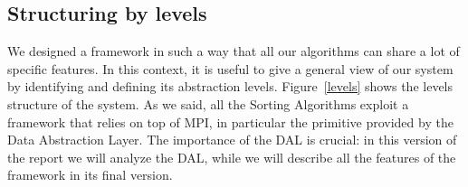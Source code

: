 \subsection{Structuring by levels}
We designed a framework in such a way that all our algorithms can share a lot of specific features. In this context, it is useful to give a general view of our system by identifying and defining its abstraction levels. Figure~\ref{levels} shows the levels structure of the system. As we said, all the Sorting Algorithms exploit a framework that relies on top of MPI, in particular the primitive provided by the Data Abstraction Layer. The importance of the DAL is crucial: in this version of the report we will analyze the DAL, while we will describe all the features of the framework in its final version.